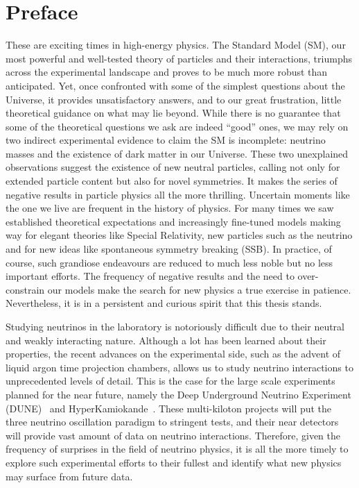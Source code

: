 \documentclass[openany,twoside,frontopenright,openright]{ip3thesis}
\begin{document}
\chapter*{Preface}

These are exciting times in high-energy physics. The Standard Model (SM), our most powerful and well-tested theory of particles and their interactions, triumphs across the experimental landscape and proves to be much more robust than anticipated. Yet, once confronted with some of the simplest questions about the Universe, it provides unsatisfactory answers, and to our great frustration, little theoretical guidance on what may lie beyond. While there is no guarantee that some of the theoretical questions we ask are indeed ``good'' ones, we may rely on two indirect experimental evidence to claim the SM is incomplete: neutrino masses and the existence of dark matter in our Universe. These two unexplained observations suggest the existence of new neutral particles, calling not only for extended particle content but also for novel symmetries. It makes the series of negative results in particle physics all the more thrilling. Uncertain moments like the one we live are frequent in the history of physics. For many times we saw established theoretical expectations and increasingly fine-tuned models making way for elegant theories like Special Relativity, new particles such as the neutrino and for new ideas like spontaneous symmetry breaking (SSB). In practice, of course, such grandiose endeavours are reduced to much less noble but no less important efforts. The frequency of negative results and the need to over-constrain our models make the search for new physics a true exercise in patience. Nevertheless, it is in a persistent and curious spirit that this thesis stands.

Studying neutrinos in the laboratory is notoriously difficult due to their neutral and weakly interacting nature. Although a lot has been learned about their properties, the recent advances on the experimental side, such as the advent of liquid argon time projection chambers, allows us to study neutrino interactions to unprecedented levels of detail. This is the case for the large scale experiments planned for the near future, namely the Deep Underground Neutrino Experiment (DUNE)~\cite{Acciarri:2015uup} and HyperKamiokande~\cite{Abe:2018uyc}. These multi-kiloton projects will put the three neutrino oscillation paradigm to stringent tests, and their near detectors will provide vast amount of data on neutrino interactions. Therefore, given the frequency of surprises in the field of neutrino physics, it is all the more timely to explore such experimental efforts to their fullest and identify what new physics may surface from future data. 
\end{document}

